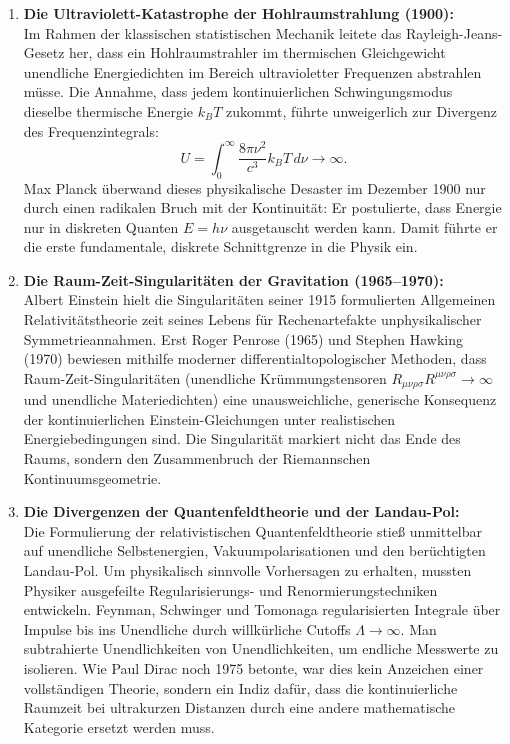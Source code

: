 \documentclass[11pt,a4paper]{article}
\theoremstyle{definition}
\theoremstyle{remark}
\numberwithin{equation}{section}
\begin{document}
\begin{enumerate}
    \item \textbf{Die Ultraviolett-Katastrophe der Hohlraumstrahlung (1900):}\\
    Im Rahmen der klassischen statistischen Mechanik leitete das Rayleigh-Jeans-Gesetz her, dass ein Hohlraumstrahler im thermischen Gleichgewicht unendliche Energiedichten im Bereich ultravioletter Frequenzen abstrahlen müsse. Die Annahme, dass jedem kontinuierlichen Schwingungsmodus dieselbe thermische Energie $k_B T$ zukommt, führte unweigerlich zur Divergenz des Frequenzintegrals:
    \begin{equation}
    U = \int_0^\infty \frac{8\pi \nu^2}{c^3} k_B T \, d\nu \longrightarrow \infty.
    \end{equation}
    Max Planck überwand dieses physikalische Desaster im Dezember 1900 nur durch einen radikalen Bruch mit der Kontinuität: Er postulierte, dass Energie nur in diskreten Quanten $E = h\nu$ ausgetauscht werden kann. Damit führte er die erste fundamentale, diskrete Schnittgrenze in die Physik ein.
    
    \item \textbf{Die Raum-Zeit-Singularitäten der Gravitation (1965--1970):}\\
    Albert Einstein hielt die Singularitäten seiner 1915 formulierten Allgemeinen Relativitätstheorie zeit seines Lebens für Rechenartefakte unphysikalischer Symmetrieannahmen. Erst Roger Penrose (1965) und Stephen Hawking (1970) bewiesen mithilfe moderner differentialtopologischer Methoden, dass Raum-Zeit-Singularitäten (unendliche Krümmungstensoren $R_{\mu\nu\rho\sigma}R^{\mu\nu\rho\sigma} \to \infty$ und unendliche Materiedichten) eine unausweichliche, generische Konsequenz der kontinuierlichen Einstein-Gleichungen unter realistischen Energiebedingungen sind. Die Singularität markiert nicht das Ende des Raums, sondern den Zusammenbruch der Riemannschen Kontinuumsgeometrie.
    
    \item \textbf{Die Divergenzen der Quantenfeldtheorie und der Landau-Pol:}\\
    Die Formulierung der relativistischen Quantenfeldtheorie stieß unmittelbar auf unendliche Selbstenergien, Vakuumpolarisationen und den berüchtigten Landau-Pol. Um physikalisch sinnvolle Vorhersagen zu erhalten, mussten Physiker ausgefeilte Regularisierungs- und Renormierungstechniken entwickeln. Feynman, Schwinger und Tomonaga regularisierten Integrale über Impulse bis ins Unendliche durch willkürliche Cutoffs $\Lambda \to \infty$. Man subtrahierte Unendlichkeiten von Unendlichkeiten, um endliche Messwerte zu isolieren. Wie Paul Dirac noch 1975 betonte, war dies kein Anzeichen einer vollständigen Theorie, sondern ein Indiz dafür, dass die kontinuierliche Raumzeit bei ultrakurzen Distanzen durch eine andere mathematische Kategorie ersetzt werden muss.
\end{enumerate}
\end{document}
